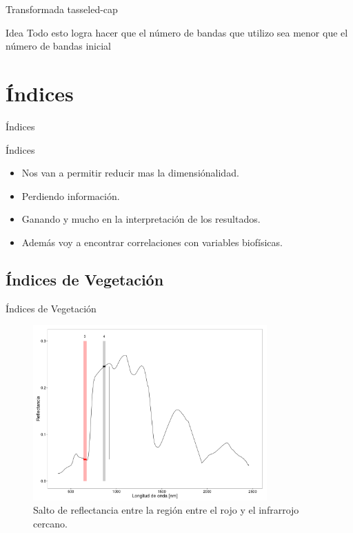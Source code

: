 \documentclass[handout]{beamer}
\begin{document}
\begin{frame}{Transformada tasseled-cap}
  \begin{block}{Idea}
    Todo esto logra hacer que el n\'umero de bandas que utilizo sea menor que el n\'umero de bandas inicial
  \end{block}
\end{frame}

\section{\'Indices}

\begin{frame}{\'Indices}
  \begin{block}{\'Indices}
    \begin{itemize}[<+>]
      \item Nos van a permitir reducir mas la dimensi\'onalidad.
      \item Perdiendo informaci\'on.
      \item Ganando y mucho en la interpretaci\'on de los resultados.
      \item Adem\'as voy a encontrar correlaciones con variables biof\'isicas.
    \end{itemize}
  \end{block}
\end{frame}

\subsection{\'Indices de Vegetaci\'on}

\begin{frame}{\'Indices de Vegetaci\'on}
    \begin{figure}
    \centering
    \includegraphics[width=0.8\textwidth]{imagenes/salto_nr.png}
    \caption{Salto de reflectancia entre la regi\'on entre el rojo y el infrarrojo cercano.}
    \end{figure}
\end{frame}
\end{document}
